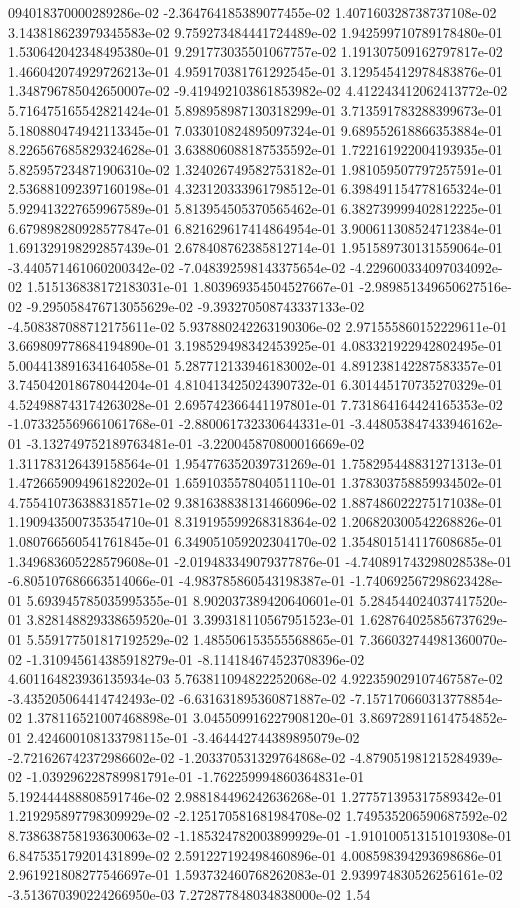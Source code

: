 094018370000289286e-02	-2.364764185389077455e-02	1.407160328738737108e-02	3.143818623979345583e-02	9.759273484441724489e-02	1.942599710789178480e-01	1.530642042348495380e-01	9.291773035501067757e-02	1.191307509162797817e-02	1.466042074929726213e-01	4.959170381761292545e-01	3.129545412978483876e-01	1.348796785042650007e-02	-9.419492103861853982e-02	4.412243412062413772e-02	5.716475165542821424e-01	5.898958987130318299e-01	3.713591783288399673e-01	5.180880474942113345e-01	7.033010824895097324e-01	9.689552618866353884e-01	8.226567685829324628e-01	3.638806088187535592e-01	1.722161922004193935e-01	5.825957234871906310e-02	1.324026749582753182e-01	1.981059507797257591e-01	2.536881092397160198e-01	4.323120333961798512e-01	6.398491154778165324e-01	5.929413227659967589e-01	5.813954505370565462e-01	6.382739999402812225e-01	6.679898280928577847e-01	6.821629617414864954e-01	3.900611308524712384e-01	1.691329198292857439e-01	2.678408762385812714e-01	1.951589730131559064e-01	-3.440571461060200342e-02	-7.048392598143375654e-02	-4.229600334097034092e-02	1.515136838172183031e-01	1.803969354504527667e-01	-2.989851349650627516e-02	-9.295058476713055629e-02	-9.393270508743337133e-02	-4.508387088712175611e-02	5.937880242263190306e-02	2.971555860152229611e-01	3.669809778684194890e-01	3.198529498342453925e-01	4.083321922942802495e-01	5.004413891634164058e-01	5.287712133946183002e-01	4.891238142287583357e-01	3.745042018678044204e-01	4.810413425024390732e-01	6.301445170735270329e-01	4.524988743174263028e-01	2.695742366441197801e-01	7.731864164424165353e-02	-1.073325569661061768e-01	-2.880061732330644331e-01	-3.448053847433946162e-01	-3.132749752189763481e-01	-3.220045870800016669e-02	1.311783126439158564e-01	1.954776352039731269e-01	1.758295448831271313e-01	1.472665909496182202e-01	1.659103557804051110e-01	1.378303758859934502e-01	4.755410736388318571e-02	9.381638838131466096e-02	1.887486022275171038e-01	1.190943500735354710e-01	8.319195599268318364e-02	1.206820300542268826e-01	1.080766560541761845e-01	6.349051059202304170e-02	1.354801514117608685e-01	1.349683605228579608e-01	-2.019483349079377876e-01	-4.740891743298028538e-01	-6.805107686663514066e-01	-4.983785860543198387e-01	-1.740692567298623428e-01	5.693945785035995355e-01	8.902037389420640601e-01	5.284544024037417520e-01	3.828148829338659520e-01	3.399318110567951523e-01	1.628764025856737629e-01	5.559177501817192529e-02	1.485506153555568865e-01	7.366032744981360070e-02	-1.310945614385918279e-01	-8.114184674523708396e-02	4.601164823936135934e-03	5.763811094822252068e-02	4.922359029107467587e-02	-3.435205064414742493e-02	-6.631631895360871887e-02	-7.157170660313778854e-02	1.378116521007468898e-01	3.045509916227908120e-01	3.869728911614754852e-01	2.424600108133798115e-01	-3.464442744389895079e-02	-2.721626742372986602e-02	-1.203370531329764868e-02	-4.879051981215284939e-02	-1.039296228789981791e-01	-1.762259994860364831e-01	5.192444488808591746e-02	2.988184496242636268e-01	1.277571395317589342e-01	1.219295897798309929e-02	-2.125170581681984708e-02	1.749535206590687592e-02	8.738638758193630063e-02	-1.185324782003899929e-01	-1.910100513151019308e-01	6.847535179201431899e-02	2.591227192498460896e-01	4.008598394293698686e-01	2.961921808277546697e-01	1.593732460768262083e-01	2.939974830526256161e-02	-3.513670390224266950e-03	7.272877848034838000e-02	1.54